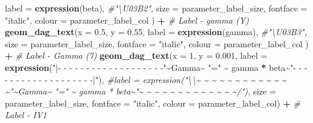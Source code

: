 \documentclass[
]{article}
\newenvironment{Shaded}{\begin{snugshade}}{\end{snugshade}}
\newcommand{\AttributeTok}[1]{\textcolor[rgb]{0.13,0.29,0.53}{#1}}
\newcommand{\CommentTok}[1]{\textcolor[rgb]{0.56,0.35,0.01}{\textit{#1}}}
\newcommand{\DecValTok}[1]{\textcolor[rgb]{0.00,0.00,0.81}{#1}}
\newcommand{\FloatTok}[1]{\textcolor[rgb]{0.00,0.00,0.81}{#1}}
\newcommand{\FunctionTok}[1]{\textcolor[rgb]{0.13,0.29,0.53}{\textbf{#1}}}
\newcommand{\NormalTok}[1]{#1}
\newcommand{\SpecialCharTok}[1]{\textcolor[rgb]{0.81,0.36,0.00}{\textbf{#1}}}
\newcommand{\StringTok}[1]{\textcolor[rgb]{0.31,0.60,0.02}{#1}}
\begin{document}
\begin{Shaded}
\begin{Highlighting}[]
                \AttributeTok{label =} \FunctionTok{expression}\NormalTok{(beta), }\CommentTok{\#"\textbackslash{}U03B2",}
                \AttributeTok{size =}\NormalTok{ parameter\_label\_size,}
                \AttributeTok{fontface =} \StringTok{"italic"}\NormalTok{,}
                \AttributeTok{colour =}\NormalTok{ parameter\_label\_col}
\NormalTok{                ) }\SpecialCharTok{+}
  \CommentTok{\# Label {-} gamma (Y)}
  \FunctionTok{geom\_dag\_text}\NormalTok{(}\AttributeTok{x =} \FloatTok{0.5}\NormalTok{, }
                \AttributeTok{y =} \FloatTok{0.55}\NormalTok{, }
                \AttributeTok{label =} \FunctionTok{expression}\NormalTok{(gamma), }\CommentTok{\#"\textbackslash{}U03B3",}
                \AttributeTok{size =}\NormalTok{ parameter\_label\_size,}
                \AttributeTok{fontface =} \StringTok{"italic"}\NormalTok{,}
                \AttributeTok{colour =}\NormalTok{ parameter\_label\_col}
\NormalTok{                ) }\SpecialCharTok{+}
  \CommentTok{\# Label {-} Gamma (7)}
  \FunctionTok{geom\_dag\_text}\NormalTok{(}\AttributeTok{x =} \DecValTok{1}\NormalTok{, }
                \AttributeTok{y =} \FloatTok{0.001}\NormalTok{, }
                \AttributeTok{label =} \FunctionTok{expression}\NormalTok{(}\StringTok{"|{-} {-} {-} {-} {-} {-} {-} {-} {-} {-} {-} {-} {-} {-} {-} {-} {-} {-} {-}"}\SpecialCharTok{\textasciitilde{}}\NormalTok{Gamma}\SpecialCharTok{\textasciitilde{}} \StringTok{"="} \SpecialCharTok{\textasciitilde{}}\NormalTok{ gamma }\SpecialCharTok{*}\NormalTok{ beta}\SpecialCharTok{\textasciitilde{}}\StringTok{"{-} {-} {-} {-} {-} {-} {-} {-} {-} {-} {-} {-} {-} {-} {-} {-} {-} {-} {-}|"}\NormalTok{), }
                \CommentTok{\#label = expression("\textbackslash{}\textbackslash{}\textasciitilde{} \textasciitilde{} \textasciitilde{} \textasciitilde{} \textasciitilde{} \textasciitilde{} \textasciitilde{} \textasciitilde{} \textasciitilde{} \textasciitilde{} \textasciitilde{} \textasciitilde{} \textasciitilde{}"\textasciitilde{}Gamma\textasciitilde{} "=" \textasciitilde{} gamma * beta\textasciitilde{}"\textasciitilde{} \textasciitilde{} \textasciitilde{} \textasciitilde{} \textasciitilde{} \textasciitilde{} \textasciitilde{} \textasciitilde{} \textasciitilde{} \textasciitilde{} \textasciitilde{} \textasciitilde{} \textasciitilde{}/"), }
                \AttributeTok{size =}\NormalTok{ parameter\_label\_size,}
                \AttributeTok{fontface =} \StringTok{"italic"}\NormalTok{, }
                \AttributeTok{colour =}\NormalTok{ parameter\_label\_col) }\SpecialCharTok{+}
  \CommentTok{\# Label {-} IV1}

\end{Highlighting}
\end{Shaded}
\end{document}
